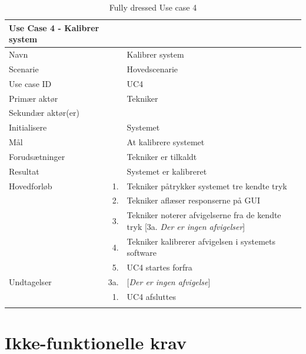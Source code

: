 
\begin{longtabu} to 
\toprule
    {\large \textbf{Use Case 4 - Kalibrer system}} && \\
    \toprule
    Navn &&    Kalibrer system\\
    Scenarie &&    Hovedscenarie\\
    Use case ID &&    UC4\\
    Primær aktør &&    Tekniker\\
    Sekundær aktør(er) &&    \\
    Initialisere &&    Systemet\\
    Mål &&    At kalibrere systemet\\
    Forudsætninger &&    Tekniker er tilkaldt\\
    Resultat &&    Systemet er kalibreret\\
    \toprule
    Hovedforløb &    1. &    Tekniker påtrykker systemet tre kendte tryk\\[-1ex]
                &    2. &   Tekniker aflæser responserne på GUI\\[-1ex]
                &    3. &    Tekniker noterer afvigelserne fra de kendte tryk\newline
                             [3a. \textit{Der er ingen afvigelser}]\\[-1ex]
                &    4. &   Tekniker kalibrerer afvigelsen i systemets software\\[-1ex]
               &	5.	&	UC4 startes forfra\\[-1ex]
    \toprule
    Undtagelser &    3a. &    [\textit{Der er ingen afvigelse}]\\[-1ex]
    &	1.	&	UC4 afsluttes\\
                \toprule
\caption{Fully dressed Use case 4}
\label{UC4}
\end{longtabu}
\newpage


\section{Ikke-funktionelle krav}


